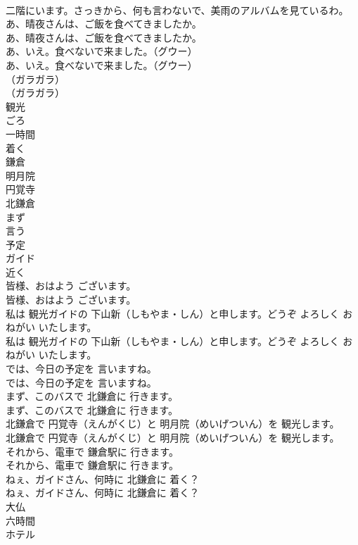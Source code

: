 \documentclass[8pt]{extreport}
\begin{document}
\begin{CJK}{UTF8}{min}
\\	二階にいます。さっきから、何も言わないで、美雨のアルバムを見ているわ。 
\\	あ、晴夜さんは、ご飯を食べてきましたか。	
\\	あ、晴夜さんは、ご飯を食べてきましたか。 
\\	あ、いえ。食べないで来ました。（グウー）	
\\	あ、いえ。食べないで来ました。（グウー） 
\\	（ガラガラ）	
\\	（ガラガラ） 
\\	観光
\\	ごろ
\\	一時間
\\	着く
\\	鎌倉
\\	明月院
\\	円覚寺
\\	北鎌倉
\\	まず
\\	言う
\\	予定
\\	ガイド
\\	近く
\\	皆様、おはよう ございます。	
\\	皆様、おはよう ございます。 
\\	私は 観光ガイドの 下山新（しもやま・しん）と申します。どうぞ よろしく おねがい いたします。	
\\	私は 観光ガイドの 下山新（しもやま・しん）と申します。どうぞ よろしく おねがい いたします。 
\\	では、今日の予定を 言いますね。	
\\	では、今日の予定を 言いますね。 
\\	まず、このバスで 北鎌倉に 行きます。	
\\	まず、このバスで 北鎌倉に 行きます。 
\\	北鎌倉で 円覚寺（えんがくじ）と 明月院（めいげついん）を 観光します。	
\\	北鎌倉で 円覚寺（えんがくじ）と 明月院（めいげついん）を 観光します。 
\\	それから、電車で 鎌倉駅に 行きます。	
\\	それから、電車で 鎌倉駅に 行きます。 
\\	ねぇ、ガイドさん、何時に 北鎌倉に 着く？	
\\	ねぇ、ガイドさん、何時に 北鎌倉に 着く？ 
\\	大仏
\\	六時間
\\	ホテル

\end{CJK}
\end{document}
